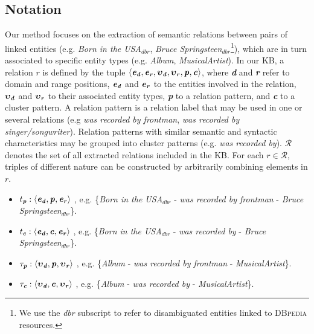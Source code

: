 \subsection{Notation}

Our method focuses on the extraction of semantic relations between pairs of  linked entities (e.g. \textit{Born in the USA}$_{dbr}$, \textit{Bruce Springsteen}$_{dbr}$\footnote{We use the \textit{dbr} subscript to refer to disambiguated entities linked to \textsc{DBpedia} resources.}), which are in turn associated to specific entity types (e.g. \textit{Album}, \textit{MusicalArtist}). In our \textsc{KB}, a relation $r$ is defined by the tuple $\langle \textbf{\textit{e}}{_\textbf{\textit{d}}},
\textbf{\textit{e}}{_\textbf{\textit{r}}},
\boldsymbol\upsilon{_\textbf{\textit{d}}},
\boldsymbol\upsilon{_\textbf{\textit{r}}},
\textbf{\textit{p}}, \textbf{\textit{c}}\rangle$, where \textbf{\textit{d}} and \textbf{\textit{r}} refer to domain and range positions, $\textbf{\textit{e}}{_\textbf{\textit{d}}}$ and $\textbf{\textit{e}}{_\textbf{\textit{r}}}$ to the entities involved in the relation, $\boldsymbol\upsilon{_\textbf{\textit{d}}}$ and
$\boldsymbol\upsilon{_\textbf{\textit{r}}}$ to their associated entity types, \textbf{\textit{p}} to a relation pattern, and \textbf{\textit{c}} to a cluster pattern.  
A relation pattern is a relation label that may be used in one or several relations (e.g \textit{was recorded by frontman}, \textit{was recorded by singer/songwriter}). Relation patterns with similar semantic and syntactic characteristics may be grouped into cluster patterns (e.g. \textit{was recorded by}). 
$\mathcal{R}$ denotes the set of all extracted relations included in the \textsc{KB}.
For each $r \in \mathcal{R}$, triples of different nature can be constructed by arbitrarily combining elements in $r$.

\begin{itemize}
    \item $t_\textbf{\textit{p}}: \langle \textbf{\textit{e}}{_\textbf{\textit{d}}},\textbf{\textit{p}},\textbf{\textit{e}}{_\textbf{\textit{r}}} \rangle$ , e.g. \{\textit{Born in the USA}$_{dbr}$ - \textit{was recorded by frontman} - \textit{Bruce Springsteen}$_{dbr}$\}.
    \item $t_\textbf{\textit{c}}: \langle \textbf{\textit{e}}{_\textbf{\textit{d}}},\textbf{\textit{c}},\textbf{\textit{e}}{_\textbf{\textit{r}}} \rangle$ , e.g. \{\textit{Born in the USA}$_{dbr}$ - \textit{was recorded by} - \textit{Bruce Springsteen}$_{dbr}$\}.
    \item $\tau_\textbf{\textit{p}}: \langle \boldsymbol\upsilon{_\textbf{\textit{d}}},\textbf{\textit{p}},\boldsymbol\upsilon{_\textbf{\textit{r}}} \rangle$ , e.g. \{\textit{Album} - \textit{was recorded by frontman} - \textit{MusicalArtist}\}.
    \item $\tau_\textbf{\textit{c}}: \langle \boldsymbol\upsilon{_\textbf{\textit{d}}},\textbf{\textit{c}},\boldsymbol\upsilon{_\textbf{\textit{r}}} \rangle$ , e.g. \{\textit{Album} - \textit{was recorded by} - \textit{MusicalArtist}\}.
\end{itemize}

